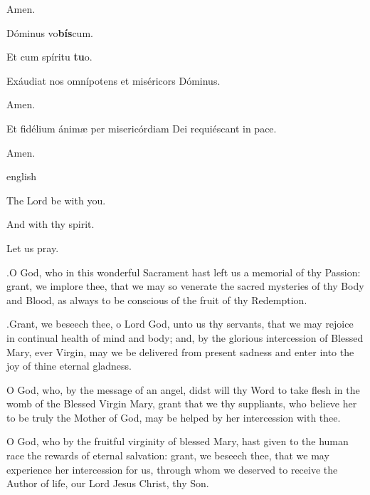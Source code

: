 {\rr Amen.

\vv Dóminus vo\textbf{bís}cum.

\rr Et cum spíritu \textbf{tu}o.


\vv Exáudiat nos omnípotens et miséricors Dóminus.

\rr Amen.


\vv Et fidélium ánimæ per misericórdiam Dei requiéscant in pace.

\rr Amen.


}
{english}
{

\noindent	\vv The Lord be with you.
	
\noindent \rr And with thy spirit.

Let us pray.

.\@ O God, who in this wonderful Sacrament hast left us a memorial of thy Passion: grant, we implore thee, that we may so venerate the sacred mysteries of thy Body and Blood, as always to be conscious of the fruit of thy Redemption.

.\@ Grant, we beseech thee, o Lord God, unto us thy servants, that we may rejoice in continual health of mind and body; and, by the glorious intercession of Blessed Mary, ever Virgin, may we be delivered from present sadness and enter into the joy of thine eternal gladness.


\noindent O God, who, by the message of an angel, didst will thy Word to take flesh in the womb of the Blessed Virgin Mary, grant that we thy suppliants, who believe her to be truly the Mother of God, may be helped by her intercession with thee.


\noindent O God, who by the fruitful virginity of blessed Mary, hast given to the human race the rewards of eternal salvation: grant, we beseech thee, that we may experience her intercession for us, through whom we deserved to receive the Author of life, our Lord Jesus Christ, thy Son.

}
